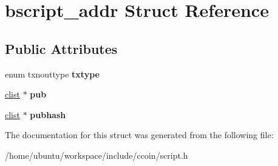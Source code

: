 \hypertarget{structbscript__addr}{\section{bscript\-\_\-addr Struct Reference}
\label{structbscript__addr}
}
\subsection*{Public Attributes}
\begin{DoxyCompactItemize}
\item 
\hypertarget{structbscript__addr_a5a8c081e491784f88ebee6ec3046467d}{enum txnouttype {\bfseries txtype}}\label{structbscript__addr_a5a8c081e491784f88ebee6ec3046467d}

\item 
\hypertarget{structbscript__addr_ac19fd502c884cce45aaeb41535d80aec}{\hyperlink{structclist}{clist} $\ast$ {\bfseries pub}}\label{structbscript__addr_ac19fd502c884cce45aaeb41535d80aec}

\item 
\hypertarget{structbscript__addr_a5f9e7cc2ab1e94c99dd467a189300e5d}{\hyperlink{structclist}{clist} $\ast$ {\bfseries pubhash}}\label{structbscript__addr_a5f9e7cc2ab1e94c99dd467a189300e5d}

\end{DoxyCompactItemize}


The documentation for this struct was generated from the following file\-:\begin{DoxyCompactItemize}
\item 
/home/ubuntu/workspace/include/ccoin/script.\-h\end{DoxyCompactItemize}
